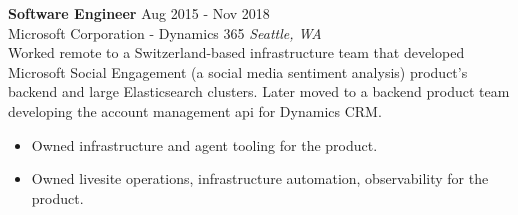 \begin{mdframed}[linewidth=2,linecolor=green, innertopmargin=1em, innerbottommargin=0em, topline=false, rightline=false, bottomline=false]
    \textbf{Software Engineer} \hfill Aug 2015 - Nov 2018\\
    Microsoft Corporation - Dynamics 365 \hfill \textit{Seattle, WA} \vspace{1em} \\
    Worked remote to a Switzerland-based infrastructure team that developed Microsoft Social Engagement (a social media sentiment analysis) product's backend and large Elasticsearch clusters. Later moved to a backend product team developing the account management api for Dynamics CRM. 
    \begin{itemize}
        \itemsep -5pt {} 
        \item Owned infrastructure and agent tooling for the product. 
        \item Owned livesite operations, infrastructure automation, observability for the product. 
     \end{itemize}
    \end{mdframed}